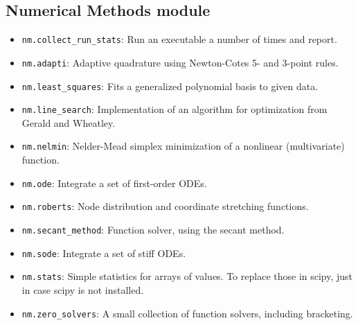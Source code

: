\documentclass[12pt,a4paper,twoside]{article}
\begin{document}
\subsection{Numerical Methods module}
  \begin{itemize}
   \item \verb!nm.collect_run_stats!: Run an executable a number of times and report.
   \item \verb!nm.adapti!: Adaptive quadrature using Newton-Cotes 5- and 3-point rules.
   \item \verb!nm.least_squares!: Fits a generalized polynomial basis to given data.
   \item \verb!nm.line_search!: Implementation of an algorithm for optimization from Gerald and Wheatley.
   \item \verb!nm.nelmin!: Nelder-Mead simplex minimization of a nonlinear (multivariate) function.
   \item \verb!nm.ode!: Integrate a set of first-order ODEs.
   \item \verb!nm.roberts!: Node distribution and coordinate stretching functions.
   \item \verb!nm.secant_method!: Function solver, using the secant method.
   \item \verb!nm.sode!: Integrate a set of stiff ODEs.
   \item \verb!nm.stats!: Simple statistics for arrays of values. 
         To replace those in scipy, just in case scipy is not installed.
   \item \verb!nm.zero_solvers!: A small collection of function solvers, including bracketing.
  \end{itemize}
\end{document}
